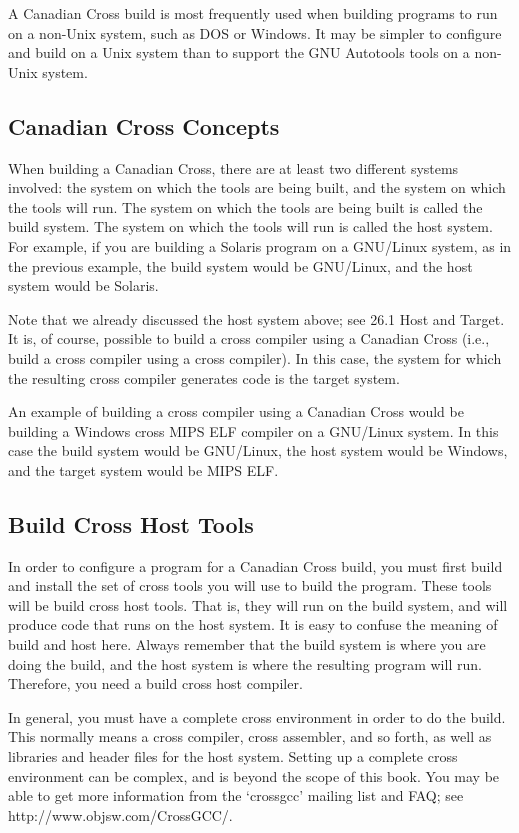 A Canadian Cross build is most frequently used when building programs to run on a non-Unix system, such as DOS or Windows. It may be simpler to configure and build on a Unix system than to support the GNU Autotools tools on a non-Unix system. 

\subsection{Canadian Cross Concepts}

When building a Canadian Cross, there are at least two different systems involved: the system on which the tools are being built, and the system on which the tools will run. The system on which the tools are being built is called the build system. The system on which the tools will run is called the host system. For example, if you are building a Solaris program on a GNU/Linux system, as in the previous example, the build system would be GNU/Linux, and the host system would be Solaris.

Note that we already discussed the host system above; see 26.1 Host and Target. It is, of course, possible to build a cross compiler using a Canadian Cross (i.e., build a cross compiler using a cross compiler). In this case, the system for which the resulting cross compiler generates code is the target system.

An example of building a cross compiler using a Canadian Cross would be building a Windows cross MIPS ELF compiler on a GNU/Linux system. In this case the build system would be GNU/Linux, the host system would be Windows, and the target system would be MIPS ELF. 

\subsection{Build Cross Host Tools}

In order to configure a program for a Canadian Cross build, you must first build and install the set of cross tools you will use to build the program. These tools will be build cross host tools. That is, they will run on the build system, and will produce code that runs on the host system. It is easy to confuse the meaning of build and host here. Always remember that the build system is where you are doing the build, and the host system is where the resulting program will run. Therefore, you need a build cross host compiler.

In general, you must have a complete cross environment in order to do the build. This normally means a cross compiler, cross assembler, and so forth, as well as libraries and header files for the host system. Setting up a complete cross environment can be complex, and is beyond the scope of this book. You may be able to get more information from the `crossgcc' mailing list and FAQ; see http://www.objsw.com/CrossGCC/. 

